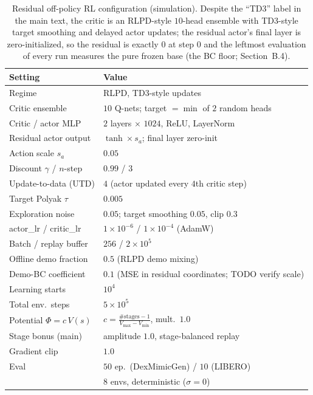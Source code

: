 \documentclass[letterpaper]{article} %
\begin{document}
\begin{table}[t]
\centering\small\setlength{\tabcolsep}{4pt}
\begin{tabular}{@{}p{}p{}@{}}
\toprule
Setting & Value \\
\midrule
Regime                          & RLPD, TD3-style updates \\
Critic ensemble                 & $10$ Q-nets; target $=\min$ of $2$ random heads \\
Critic / actor MLP              & $2$ layers $\times$ $1024$, ReLU, LayerNorm \\
Residual actor output           & $\tanh \times s_a$; final layer zero-init \\
Action scale $s_a$              & $0.05$ \\
Discount $\gamma$ / $n$-step    & $0.99$ / $3$ \\
Update-to-data (UTD)            & $4$ (actor updated every $4$th critic step) \\
Target Polyak $\tau$            & $0.005$ \\
Exploration noise               & $0.05$; target smoothing $0.05$, clip $0.3$ \\
actor\_lr / critic\_lr          & $1{\times}10^{-6}$ / $1{\times}10^{-4}$ (AdamW) \\
Batch / replay buffer           & $256$ / $2{\times}10^{5}$ \\
Offline demo fraction           & $0.5$ (RLPD demo mixing) \\
Demo-BC coefficient             & $0.1$ (MSE in residual coordinates; TODO verify scale) \\
Learning starts                 & $10^{4}$ \\
Total env.\ steps               & $5{\times}10^{5}$ \\
Potential $\Phi=c\,V(s)$        & $c=\frac{\#\text{stages}-1}{V_{\max}-V_{\min}}$, mult.\ $1.0$ \\
Stage bonus (main)              & amplitude $1.0$, stage-balanced replay \\
Gradient clip                   & $1.0$ \\
Eval                            & $50$ ep.\ (DexMimicGen) / $10$ (LIBERO) \\
\quad                          & $8$ envs, deterministic ($\sigma{=}0$) \\
\bottomrule
\end{tabular}
\caption{Residual off-policy RL configuration (simulation). Despite the ``TD3''
label in the main text, the critic is an RLPD-style $10$-head ensemble with
TD3-style target smoothing and delayed actor updates; the residual actor's final
layer is zero-initialized, so the residual is exactly $0$ at step $0$ and the
leftmost evaluation of every run measures the pure frozen base (the BC floor;
Section~B.4).}
\label{tab:simresrl}
\end{table}
\end{document}
